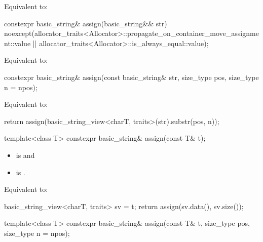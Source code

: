 \begin{itemdescr}
\pnum
\effects
Equivalent to: 
\end{itemdescr}

%
\begin{itemdecl}
constexpr basic_string& assign(basic_string&& str)
  noexcept(allocator_traits<Allocator>::propagate_on_container_move_assignment::value ||
           allocator_traits<Allocator>::is_always_equal::value);
\end{itemdecl}

\begin{itemdescr}
\pnum
\effects
Equivalent to: 
\end{itemdescr}


%
\begin{itemdecl}
constexpr basic_string& assign(const basic_string& str, size_type pos, size_type n = npos);
\end{itemdecl}

\begin{itemdescr}
\pnum
\effects
Equivalent to:
\begin{codeblock}
return assign(basic_string_view<charT, traits>(str).substr(pos, n));
\end{codeblock}
\end{itemdescr}

%
\begin{itemdecl}
template<class T>
  constexpr basic_string& assign(const T& t);
\end{itemdecl}

\begin{itemdescr}
\pnum
\constraints
\begin{itemize}
\item
{} is
 and
\item
{} is
.
\end{itemize}

\pnum
\effects
Equivalent to:
\begin{codeblock}
basic_string_view<charT, traits> sv = t;
return assign(sv.data(), sv.size());
\end{codeblock}
\end{itemdescr}

%
\begin{itemdecl}
template<class T>
  constexpr basic_string& assign(const T& t, size_type pos, size_type n = npos);
\end{itemdecl}

